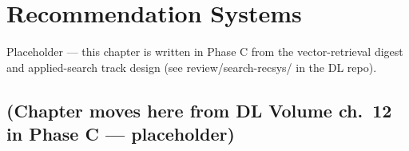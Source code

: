 \chapter{Recommendation Systems}
\label{sr:chap:recommendation_systems}

\begin{tldr}
Placeholder — this chapter is written in Phase C from the vector-retrieval digest and applied-search track design (see review/search-recsys/ in the DL repo).
\end{tldr}

\section{(Chapter moves here from DL Volume ch.\ 12 in Phase C — placeholder)}

